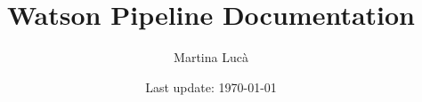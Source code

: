 \documentclass{article}
\title{Watson Pipeline Documentation}
\author{Martina Lucà \href{mailto:martina.luca@univr.it}{\faEnvelope[regular]}}
\date{Last update: \today}
\begin{document}
\maketitle

\small
\tableofcontents
\normalsize





\end{document}
